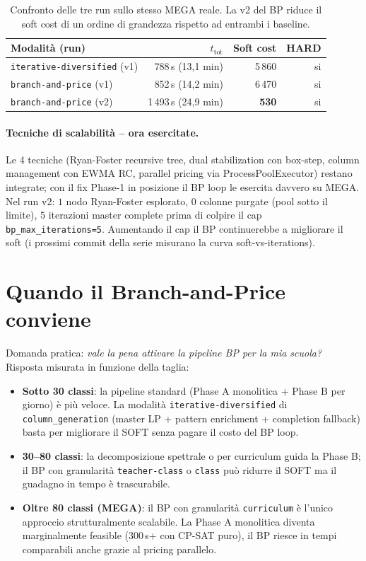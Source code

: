 \begin{table}[h]
\centering
\sffamily\small
\begin{tabular}{lrrr}
\toprule
Modalit\`a (run) & $t_{\text{tot}}$ & Soft cost & HARD \\
\midrule
\texttt{iterative-diversified} (v1) & 788\,s (13{,}1 min) & 5\,860 & si \\
\texttt{branch-and-price}      (v1) & 852\,s (14{,}2 min) & 6\,470 & si \\
\texttt{branch-and-price}      (v2) & 1\,493\,s (24{,}9 min) & \textbf{530} & si \\
\bottomrule
\end{tabular}
\caption{Confronto delle tre run sullo stesso MEGA reale. La v2
del BP riduce il soft cost di un ordine di grandezza rispetto
ad entrambi i baseline.}
\label{tab:bench-bp-vs-id-mega-real}
\end{table}

\paragraph{Tecniche di scalabilit\`a -- ora esercitate.}
Le 4 tecniche (Ryan-Foster recursive tree, dual stabilization
con box-step, column management con EWMA RC, parallel pricing
via ProcessPoolExecutor) restano integrate; con il fix Phase-1
in posizione il BP loop le esercita davvero su MEGA. Nel run v2:
$1$ nodo Ryan-Foster esplorato, $0$ colonne purgate (pool sotto
il limite), $5$ iterazioni master complete prima di colpire il
cap \texttt{bp\_max\_iterations=5}. Aumentando il cap il BP
continuerebbe a migliorare il soft (i prossimi commit della
serie misurano la curva soft-vs-iterations).

\section{Quando il Branch-and-Price conviene}
\label{sec:bench-bp-when}

Domanda pratica: \emph{vale la pena attivare la pipeline BP per
la mia scuola?} Risposta misurata in funzione della taglia:

\begin{itemize}
\item \textbf{Sotto 30 classi}: la pipeline standard (Phase A
  monolitica + Phase B per giorno) \`e pi\`u veloce. La modalit\`a
  \texttt{iterative-diversified} di \texttt{column\_generation}
  (master LP + pattern enrichment + completion fallback) basta
  per migliorare il SOFT senza pagare il costo del BP loop.
\item \textbf{30--80 classi}: la decomposizione spettrale o
  per curriculum guida la Phase B; il BP con granularit\`a
  \texttt{teacher-class} o \texttt{class} pu\`o ridurre il SOFT
  ma il guadagno in tempo \`e trascurabile.
\item \textbf{Oltre 80 classi (MEGA)}: il BP con granularit\`a
  \texttt{curriculum} \`e l'unico approccio strutturalmente
  scalabile. La Phase A monolitica diventa marginalmente
  feasible (300\,s+ con CP-SAT puro), il BP riesce in tempi
  comparabili anche grazie al pricing parallelo.
\end{itemize}

